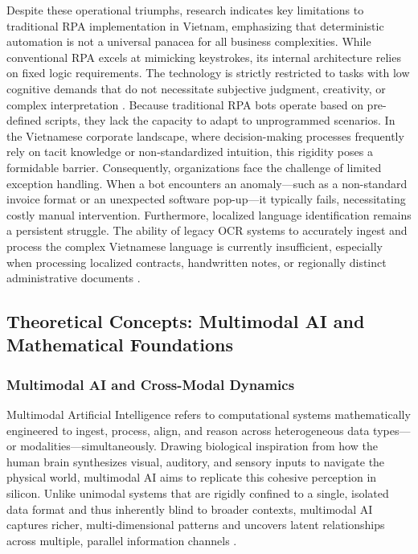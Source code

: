 Despite these operational triumphs, research indicates key limitations to traditional RPA implementation in Vietnam, emphasizing that deterministic automation is not a universal panacea for all business complexities. While conventional RPA excels at mimicking keystrokes, its internal architecture relies on fixed logic requirements. The technology is strictly restricted to tasks with low cognitive demands that do not necessitate subjective judgment, creativity, or complex interpretation \parencite{kephart2021multimodal}. Because traditional RPA bots operate based on pre-defined scripts, they lack the capacity to adapt to unprogrammed scenarios. In the Vietnamese corporate landscape, where decision-making processes frequently rely on tacit knowledge or non-standardized intuition, this rigidity poses a formidable barrier. Consequently, organizations face the challenge of limited exception handling. When a bot encounters an anomaly—such as a non-standard invoice format or an unexpected software pop-up—it typically fails, necessitating costly manual intervention. Furthermore, localized language identification remains a persistent struggle. The ability of legacy OCR systems to accurately ingest and process the complex Vietnamese language is currently insufficient, especially when processing localized contracts, handwritten notes, or regionally distinct administrative documents \parencite{le2024phowhisper, sura2025multimodal}.

\subsection{Theoretical Concepts: Multimodal AI and Mathematical Foundations}

\subsubsection{Multimodal AI and Cross-Modal Dynamics}
Multimodal Artificial Intelligence refers to computational systems mathematically engineered to ingest, process, align, and reason across heterogeneous data types—or modalities—simultaneously. Drawing biological inspiration from how the human brain synthesizes visual, auditory, and sensory inputs to navigate the physical world, multimodal AI aims to replicate this cohesive perception in silicon. Unlike unimodal systems that are rigidly confined to a single, isolated data format and thus inherently blind to broader contexts, multimodal AI captures richer, multi-dimensional patterns and uncovers latent relationships across multiple, parallel information channels \parencite{khan2025adaptive, sura2025multimodal}.

